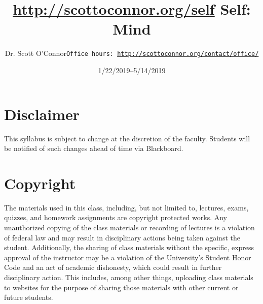 \documentclass[article,oneside]{memoir}
\def\myauthor{Author}
\def\mytitle{Title}
\def\mycopyright{\myauthor}
\def\myweb{\href{http://scottoconnor.org/self}{http://scottoconnor.org/self}}
\def\myauthor{Dr. Scott O'Connor}
\def\mytitle{{\normalsize \myweb \newline} \HUGE Self: Mind}
\begin{document}
\setsansfont[Mapping=tex-text]{Myriad Pro} 
\setmonofont[Mapping=tex-text,Scale=0.8]{Georgia} 

\def\ind{\hangindent=1 true cm\hangafter=1 \noindent}
\def\labelitemi{$\cdot$}


\title{\LARGE \mytitle}     
\author{\Large\myauthor \newline \footnotesize\texttt{\noindent Office hours: \href{http://scottoconnor.org/contact/office/}{http://scottoconnor.org/contact/office/}}}
\date{1/22/2019--5/14/2019}


\maketitle




%
%


\section{Disclaimer}
 This syllabus is subject to change at the discretion of the faculty. Students will be notified of such changes ahead of time via Blackboard. 


\section{Copyright}
The materials used in this class, including, but not limited to, lectures, exams, quizzes, and homework assignments are copyright protected works.  Any unauthorized copying of the class materials or recording of lectures is a violation of federal law and may result in disciplinary actions being taken against the student.  Additionally, the sharing of class materials without the specific, express approval of the instructor may be a violation of the University's Student Honor Code and an act of academic dishonesty, which could result in further disciplinary action.  This includes, among other things, uploading class materials to websites for the purpose of sharing those materials with other current or future students. 
\end{document}
